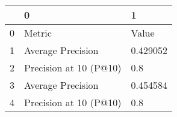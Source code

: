 \begin{tabular}{lll}
\toprule
{} &                       0 &         1 \\
\midrule
0 &                  Metric &     Value \\
1 &       Average Precision &  0.429052 \\
2 &  Precision at 10 (P@10) &       0.8 \\
3 &       Average Precision &  0.454584 \\
4 &  Precision at 10 (P@10) &       0.8 \\
\bottomrule
\end{tabular}
